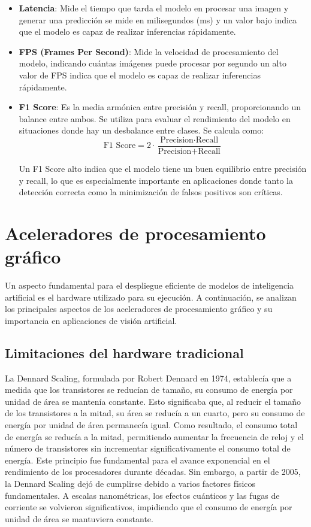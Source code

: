 \documentclass[11pt,spanish,listoffigures,listoftables]{tfgetsinf}
\begin{document}
\begin{itemize}
   \item \textbf{Latencia}: Mide el tiempo que tarda el modelo en procesar una imagen y generar una predicción se mide en milisegundos (ms) y un valor bajo indica que el modelo es capaz de realizar inferencias rápidamente.
   
   \item \textbf{FPS (Frames Per Second)}: Mide la velocidad de procesamiento del modelo, indicando cuántas imágenes puede procesar por segundo un alto valor de FPS indica que el modelo es capaz de realizar inferencias rápidamente.
   \item \textbf{F1 Score}: Es la media armónica entre precisión y recall, proporcionando un balance entre ambos. Se utiliza para evaluar el rendimiento del modelo en situaciones donde hay un desbalance entre clases. Se calcula como:
   \[
   \text{F1 Score} = 2 \cdot \frac{\text{Precision} \cdot \text{Recall}}{\text{Precision} + \text{Recall}}
   \]

   Un F1 Score alto indica que el modelo tiene un buen equilibrio entre precisión y recall, lo que es especialmente importante en aplicaciones donde tanto la detección correcta como la minimización de falsos positivos son críticas.

\end{itemize}


\section{Aceleradores de procesamiento gráfico}
Un aspecto fundamental para el despliegue eficiente de modelos de inteligencia artificial es el hardware utilizado para su ejecución. A continuación, se analizan los principales aspectos de los aceleradores de procesamiento gráfico y su importancia en aplicaciones de visión artificial.

\subsection{Limitaciones del hardware tradicional}

La Dennard Scaling, formulada por Robert Dennard en 1974, establecía que a medida que los transistores se reducían de tamaño, su consumo de energía por unidad de área se mantenía constante. Esto significaba que, al reducir el tamaño de los transistores a la mitad, su área se reducía a un cuarto, pero su consumo de energía por unidad de área permanecía igual. Como resultado, el consumo total de energía se reducía a la mitad, permitiendo aumentar la frecuencia de reloj y el número de transistores sin incrementar significativamente el consumo total de energía. Este principio fue fundamental para el avance exponencial en el rendimiento de los procesadores durante décadas. Sin embargo, a partir de 2005, la Dennard Scaling dejó de cumplirse debido a varios factores físicos fundamentales. A escalas nanométricas, los efectos cuánticos y las fugas de corriente se volvieron significativos, impidiendo que el consumo de energía por unidad de área se mantuviera constante.
\end{document}

